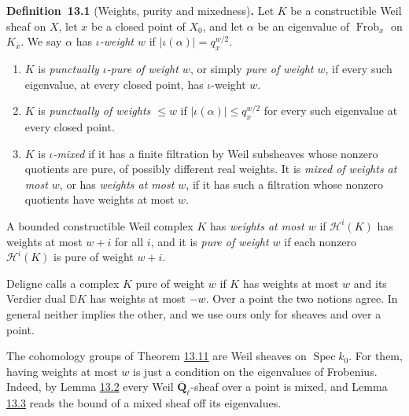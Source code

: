 \documentclass[11pt]{article}
\newenvironment{bpstatement}[2]{\par\addvspace{0.6\baselineskip}\noindent\textbf{#1}#2\textbf{.}\enspace\ignorespaces}
  {\par\addvspace{0.4\baselineskip}}
\begin{document}
\label{bp7}%
\begin{bpstatement}{Definition~13.1}{ (Weights, purity and mixedness)}
Let \(K\) be a constructible Weil sheaf on \(X\), let \(x\) be a closed point of \(X_0\), and let \(\alpha\) be an eigenvalue of \(\operatorname{Frob}_x\) on \(K_{\bar x}\). We say \(\alpha\) has \emph{\(\iota\)-weight \(w\)} if \(|\iota(\alpha)|=q_x^{w/2}\).

\begin{enumerate}
\item \(K\) is \emph{punctually \(\iota\)-pure of weight \(w\)}, or simply \emph{pure of weight \(w\)}, if every such eigenvalue, at every closed point, has \(\iota\)-weight \(w\).
\item \(K\) is \emph{punctually of weights \(\le w\)} if \(|\iota(\alpha)|\le q_x^{w/2}\) for every such eigenvalue at every closed point.
\item \(K\) is \emph{\(\iota\)-mixed} if it has a finite filtration by Weil subsheaves whose nonzero quotients are pure, of possibly different real weights. It is \emph{mixed of weights at most \(w\)}, or has \emph{weights at most \(w\)}, if it has such a filtration whose nonzero quotients have weights at most \(w\).
\end{enumerate}

A bounded constructible Weil complex \(K\) has \emph{weights at most \(w\)} if \(\mathcal H^i(K)\) has weights at most \(w+i\) for all \(i\), and it is \emph{pure of weight \(w\)} if each nonzero \(\mathcal H^i(K)\) is pure of weight \(w+i\).
\end{bpstatement}

\label{bp8}%
Deligne calls a complex \(K\) pure of weight \(w\) if \(K\) has weights at most \(w\) and its Verdier dual \(\mathbb D K\) has weights at most \(-w\). Over a point the two notions agree. In general neither implies the other, and we use ours only for sheaves and over a point.

The cohomology groups of Theorem \hyperref[bp36]{13.11} are Weil sheaves on \(\operatorname{Spec}k_0\). For them, having weights at most \(w\) is just a condition on the eigenvalues of Frobenius. Indeed, by Lemma \hyperref[bp9]{13.2} every Weil \(\overline{\mathbf Q}_\ell\)-sheaf over a point is mixed, and Lemma \hyperref[bp12]{13.3} reads the bound of a mixed sheaf off its eigenvalues.
\end{document}
